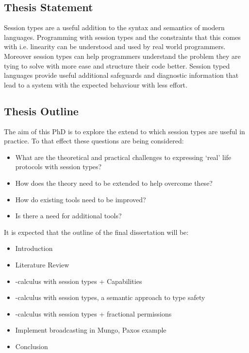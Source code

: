 \subsection{Thesis Statement}
Session types are a useful addition to the syntax and semantics of modern languages. Programming with session types and the constraints that this comes with i.e. linearity can be understood and used by real world programmers. Moreover session types can help programmers understand the problem they are tying to solve with more ease and structure their code better.
Session typed languages provide useful additional safeguards and diagnostic information that lead to a system with the expected behaviour with less effort.

\subsection{Thesis Outline}


The aim of this PhD is to explore the extend to which session types are useful in practice. To that effect these questions are being considered:

\begin{itemize}
\item What are the theoretical and practical challenges to expressing `real' life protocols with session types?
\item How does the theory need to be extended to help overcome these?
\item How do existing tools need to be improved?
\item Is there a need for additional tools?
\end{itemize}


It is expected that the outline of the final dissertation will be:

\begin{itemize}
  \item Introduction
  \item Literature Review
  \item \Pi-calculus with session types + Capabilities
  \item \Pi-calculus with session types, a semantic approach to type safety
  \item \Pi-calculus with session types + fractional permissions
  \item Implement broadcasting in Mungo, Paxos example

  \item Conclusion
\end{itemize}


